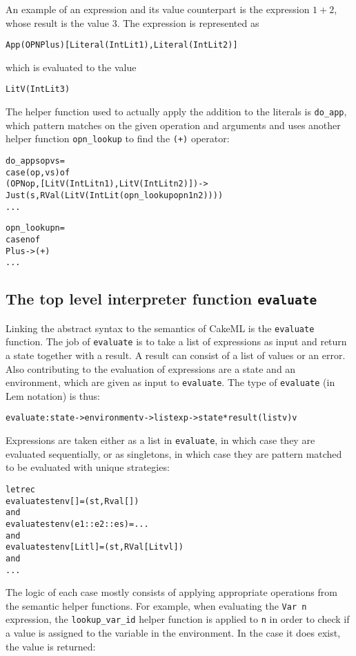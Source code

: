 An example of an expression and its value counterpart is the expression $1 + 2$,
whose result is the value 3. The expression is represented as
\begin{alltt}
  App (OPN Plus) [Literal (IntLit 1), Literal (IntLit 2)]
\end{alltt}
which is evaluated to the value
\begin{alltt}
  LitV (IntLit 3)
\end{alltt}
The helper function used to actually apply the addition to the literals
is \texttt{do\_app},
which pattern matches on the given operation and arguments and
uses another helper function \texttt{opn\_lookup} to find the \texttt{(+)}
operator:
\begin{alltt}
  do_app s op vs =
    case (op, vs) of
      (OPN op, [LitV (IntLit n1), LitV (IntLit n2)]) ->
        Just (s, RVal (LitV (IntLit (opn_lookup op n1 n2))))
  ...

  opn_lookup n =
    case n of
      Plus   -> (+)
  ...
\end{alltt}


\subsection{The top level interpreter function \texttt{evaluate}}
Linking the abstract syntax to the semantics of CakeML is the
\texttt{evaluate} function. The job of \texttt{evaluate} is to take a list of
expressions as input and return a state together with a result. A result can
consist of a list of values or an error. Also contributing to the evaluation
of expressions are a state and an environment, which are given as input to
\texttt{evaluate}. The type of \texttt{evaluate} (in Lem notation) is thus:

\begin{alltt}
  evaluate:state -> environment v -> list exp -> state*result (list v) v
\end{alltt}

\noindent Expressions are taken either as a list in \texttt{evaluate},
in which case they are evaluated sequentially, or as singletons, in which case
they are pattern matched to be evaluated with unique strategies:
\newpage
\begin{alltt}
  let rec
  evaluate st env []           = (st, Rval [])
  and
  evaluate st env (e1::e2::es) = ...
  and
  evaluate st env [Lit l]      = (st, RVal [Litv l])
  and
  ...
\end{alltt}

\noindent The logic of each case mostly consists of applying appropriate
operations from the semantic helper functions. For example, when evaluating
the \texttt{Var n} expression, the \texttt{lookup\_var\_id} helper function
is applied to \texttt{n} in order to check if
a value is assigned to the variable in the environment. In the case it does
exist, the value is returned:

